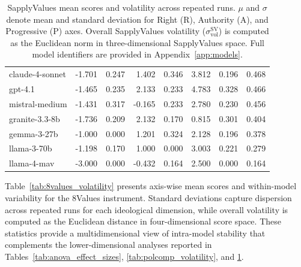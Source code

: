 \documentclass[11pt]{article}
\begin{document}
\begin{table}[t]
\begin{tabular}{l r r r r r r r}
claude-4-sonnet  & -1.701 & 0.247 &  1.402 & 0.346 & 3.812 & 0.196 & 0.468 \\
gpt-4.1          & -1.465 & 0.235 &  2.133 & 0.233 & 4.783 & 0.328 & 0.466 \\
mistral-medium   & -1.431 & 0.317 & -0.165 & 0.233 & 2.780 & 0.230 & 0.456 \\
granite-3.3-8b   & -1.736 & 0.209 &  2.132 & 0.170 & 0.815 & 0.301 & 0.404 \\
gemma-3-27b      & -1.000 & 0.000 &  1.201 & 0.324 & 2.128 & 0.196 & 0.378 \\
llama-3-70b      & -1.198 & 0.170 &  1.000 & 0.000 & 3.003 & 0.221 & 0.279 \\
llama-4-mav      & -3.000 & 0.000 & -0.432 & 0.164 & 2.500 & 0.000 & 0.164 \\
\bottomrule
\end{tabular}
\caption{SapplyValues mean scores and volatility across repeated runs. $\mu$ and $\sigma$ denote mean and standard deviation for Right (R), Authority (A), and Progressive (P) axes. Overall SapplyValues volatility ($\sigma^{\text{SV}}_{\text{vol}}$) is computed as the Euclidean norm in three-dimensional SapplyValues space. Full model identifiers are provided in Appendix~\ref{app:models}.}
\label{tab:sapply_volatility}
\end{table}



Table~\ref{tab:8values_volatility} presents axis-wise mean scores and within-model variability for the 8Values instrument. Standard deviations capture dispersion across repeated runs for each ideological dimension, while overall volatility is computed as the Euclidean distance in four-dimensional score space. These statistics provide a multidimensional view of intra-model stability that complements the lower-dimensional analyses reported in Tables~\ref{tab:anova_effect_sizes}, \ref{tab:polcomp_volatility}, and \ref{tab:sapply_volatility}.
\end{document}
